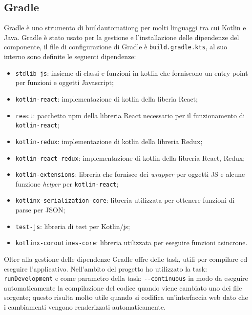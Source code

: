 \subsection{Gradle}
Gradle è uno strumento di \gls{buildautomationg} per molti linguaggi tra cui Kotlin e Java. Gradle è stato usato per la gestione e l'installazione delle dipendenze del componente, il file di configurazione di Gradle è \verb|build.gradle.kts|, al suo interno sono definite le seguenti dipendenze:
\begin{itemize}
	\item \verb|stdlib-js|: insieme di classi e funzioni in kotlin che forniscono un entry-point per funzioni e oggetti Javascript;
	
	\item \verb|kotlin-react|: implementazione di kotlin della liberia React;
	
	\item \verb|react|: pacchetto npm della libreria React necessario per il funzionamento di \verb|kotlin-react|;
	
	\item \verb|kotlin-redux|: implementazione di kotlin della libreria Redux;
	
	\item \verb|kotlin-react-redux|: implementazione di kotlin della libreria React, Redux;
	
	\item \verb|kotlin-extensions|: libreria che fornisce dei \emph{wrapper} per oggetti JS e alcune funzione \emph{helper} per \verb|kotlin-react|;
	
	\item \verb|kotlinx-serialization-core|: libreria utilizzata per ottenere funzioni di parse per JSON;
	
	\item \verb|test-js|: libreria di test per Kotlin/js;
	
	\item \verb|kotlinx-coroutines-core|: libreria utilizzata per eseguire funzioni asincrone.
\end{itemize}
\noindent
Oltre alla gestione delle dipendenze Gradle offre delle task, utili per compilare ed eseguire l'applicativo. Nell'ambito del progetto ho utilizzato la task: \verb|runDevelopment| e come parametro della task: \verb|--continuous| in modo da eseguire automaticamente la compilazione del codice quando viene cambiato uno dei file sorgente; questo risulta molto utile quando si codifica un'interfaccia web dato che i cambiamenti vengono renderizzati automaticamente.

